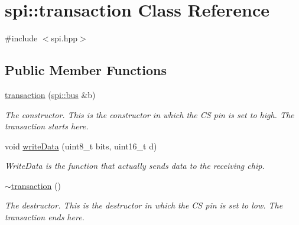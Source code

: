 \hypertarget{classspi_1_1transaction}{}\section{spi\+:\+:transaction Class Reference}
\label{classspi_1_1transaction}


{\ttfamily \#include $<$spi.\+hpp$>$}

\subsection*{Public Member Functions}
\begin{DoxyCompactItemize}
\item 
\hyperlink{classspi_1_1transaction_a036b6dc350f32eba0398d6914967cf5a}{transaction} (\hyperlink{classspi_1_1bus}{spi\+::bus} \&b)
\begin{DoxyCompactList}\small\item\em The constructor. This is the constructor in which the CS pin is set to high. The transaction starts here. \end{DoxyCompactList}\item 
void \hyperlink{classspi_1_1transaction_af55307deed871fb9b7e9ad13872430e0}{write\+Data} (uint8\+\_\+t bits, uint16\+\_\+t d)
\begin{DoxyCompactList}\small\item\em Write\+Data is the function that actually sends data to the receiving chip. \end{DoxyCompactList}\item 
\mbox{\label{classspi_1_1transaction_a26fdfc5232a23f7d7bd5d462518c4fa9}} 
\hyperlink{classspi_1_1transaction_a26fdfc5232a23f7d7bd5d462518c4fa9}{$\sim$transaction} ()
\begin{DoxyCompactList}\small\item\em The destructor. This is the destructor in which the CS pin is set to low. The transaction ends here. \end{DoxyCompactList}\end{DoxyCompactItemize}
